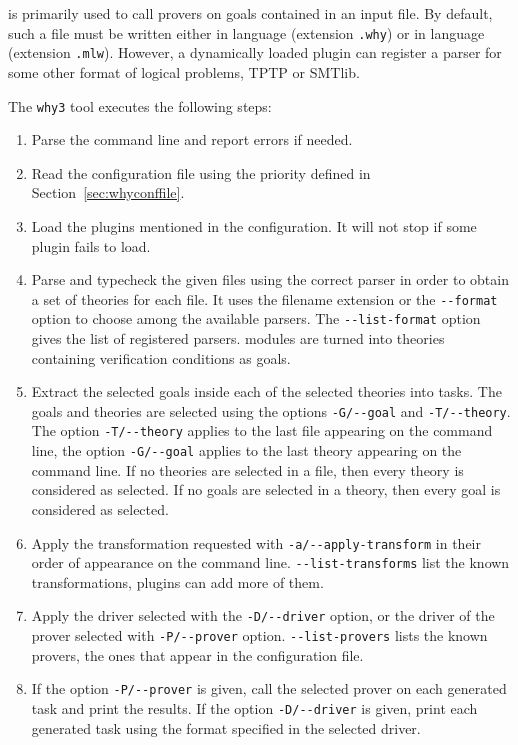 \why is primarily used to call provers on goals contained in an
input file. By default, such a file must be written either in \why language
(extension \texttt{.why}) or in \whyml language (extension \texttt{.mlw}).
However, a dynamically loaded
plugin can register a parser for some other format of logical problems,
\eg{} TPTP or SMTlib.

The \texttt{why3} tool executes the following steps:
\begin{enumerate}
\item Parse the command line and report errors if needed.
\item Read the configuration file using the priority defined in
  Section~\ref{sec:whyconffile}.
\item Load the plugins mentioned in the configuration. It will not
  stop if some plugin fails to load.
\item Parse and typecheck the given files using the correct parser in order
  to obtain a set of \why theories for each file. It uses
  the filename extension or the \verb|--format| option to choose
  among the available parsers. The \verb|--list-format| option gives
  the list of registered parsers.
  \whyml modules are turned into
  theories containing verification conditions as goals.
\item Extract the selected goals inside each of the selected theories
  into tasks. The goals and theories are selected using the options
  \verb|-G/--goal| and \verb|-T/--theory|. The option
  \verb|-T/--theory| applies to the last file appearing on the
  command line, the option \verb|-G/--goal| applies to the last theory
  appearing on the command line. If no theories are selected in a file,
  then every theory is considered as selected. If no goals are selected
  in a theory, then every goal is considered as selected.
\item Apply the transformation requested
  with \verb|-a/--apply-transform| in their order of appearance on the
  command line. \verb|--list-transforms| list the known
  transformations, plugins can add more of them.
\item Apply the driver selected with the \verb|-D/--driver| option,
  or the driver of the prover selected with \verb|-P/--prover|
  option. \verb|--list-provers| lists the known provers, \ie the ones
  that appear in the configuration file.
\item If the option \verb|-P/--prover| is given, call the selected prover
  on each generated task and print the results. If the option
  \verb|-D/--driver| is given, print each generated task using
  the format specified in the selected driver.
\end{enumerate}

